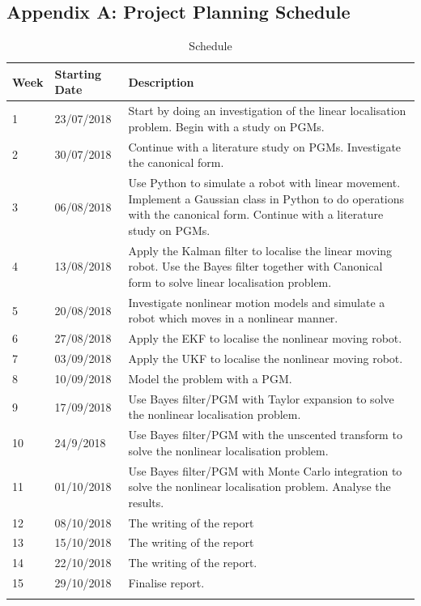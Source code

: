 \documentclass[12pt,oneside,openany,a4paper, %
afrikaans,english,
]{memoir}
\numberwithin{equation}{chapter}
\begin{document}
{\begin{appendices}
\chapter{Appendix A: Project Planning Schedule}
\begin{longtable}{ ||l|l|m{11cm}|| }
\hline
Week & Starting Date & Description\\
\hline \hline
1  & 23/07/2018 & Start by doing an investigation of the linear localisation problem. Begin with a study on PGMs.\\
\hline 
2 & 30/07/2018 & Continue with a literature study on PGMs. Investigate the canonical form.\\
\hline  
3 & 06/08/2018 & Use Python to simulate a robot with linear movement. Implement a Gaussian class in Python to do operations with the canonical form. Continue with a literature study on PGMs.\\
\hline 
4 & 13/08/2018& Apply the Kalman filter to localise the linear moving robot. Use the Bayes filter together with Canonical form to solve linear localisation problem.\\
\hline  
5 & 20/08/2018 & Investigate nonlinear motion models and simulate a robot which moves in a nonlinear manner.\\
\hline
6 & 27/08/2018 & Apply the EKF to localise the nonlinear moving robot.\\
\hline
7 & 03/09/2018 & Apply the UKF to localise the nonlinear moving robot.\\
\hline
8 & 10/09/2018 & Model the problem with a PGM.\\
\hline
9 & 17/09/2018 & Use Bayes filter/PGM with Taylor expansion to solve the nonlinear localisation problem.\\
\hline
10 & 24/9/2018 & Use Bayes filter/PGM with the unscented transform to solve the nonlinear localisation problem.\\
\hline
11 & 01/10/2018 & Use Bayes filter/PGM with Monte Carlo integration to solve the nonlinear localisation problem. Analyse the results.\\
\hline
12 & 08/10/2018 & The writing of the report\\
\hline
13 & 15/10/2018 & The writing of the report\\
\hline
14 & 22/10/2018 & The writing of the report.\\
\hline
15 & 29/10/2018 & Finalise report.\\
\hline
\caption{Schedule}
\end{longtable}

\end{appendices}}
\end{document}
